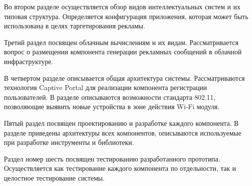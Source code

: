 Во втором разделе осуществляется обзор видов интеллектуальных систем и их типовая структура. Определяется конфигурация приложения, которая может быть использована в целях таргетирования рекламы.

Третий раздел посвящен облачным вычислениям и их видам. Рассматривается вопрос о размещении компонента генерации рекламных сообщений в облачной инфраструктуре.

В четвертом разделе описывается общая архитектура системы. Рассматриваются технология Captive Portal для реализации компонента регистрации пользователей. В разделе описываются возможности стандарта 802.11, позволяющие выявить новые устройства в зоне действия Wi-Fi модуля. 

Пятый раздел посвящен проектированию и разработке каждого компонента. В разделе приведены архитектуры всех компонентов, описываются используемые при разработке инструменты и библиотеки.

Раздел номер шесть посвящен тестированию разработанного прототипа. Осуществляется как тестирование каждого компонента по отдельности, так и целостное тестирование системы.

